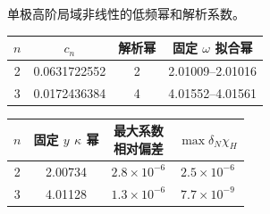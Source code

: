 \documentclass[UTF8,fontset=fandol,11pt,a4paper,oneside]{ctexart}
\numberwithin{equation}{section}
\begin{document}
\noindent\begin{minipage}{\linewidth}
\captionsetup{type=table}\caption{单极高阶局域非线性的低频幂和解析系数。}\label{audit:tab:power-l0}
\centering\fontsize{10}{13.5}\selectfont
\setlength{\tabcolsep}{6pt}\renewcommand{\arraystretch}{1.2}
\par{}\par\smallskip
\begin{tabular}{cccc}\toprule
$n$ & $c_n$ & 解析幂 & \shortstack{固定 $\omega$\\拟合幂}\\\midrule
2 & 0.0631722552 & 2 & 2.01009--2.01016\\
3 & 0.0172436384 & 4 & 4.01552--4.01561\\
\bottomrule\end{tabular}
\par\medskip
\par{}\par\smallskip
\begin{tabular}{cccc}\toprule
$n$ & \shortstack{固定 $y$\\$\kappa$ 幂} & \shortstack{最大系数\\相对偏差} & $\max\delta_N\chi_H$\\\midrule
2 & 2.00734 & $2.8\times10^{-6}$ & $2.5\times10^{-6}$\\
3 & 4.01128 & $1.3\times10^{-6}$ & $7.7\times10^{-9}$\\
\bottomrule\end{tabular}
\end{minipage}\par\addvspace{10pt}
\par\addvspace{14pt}
\end{document}
